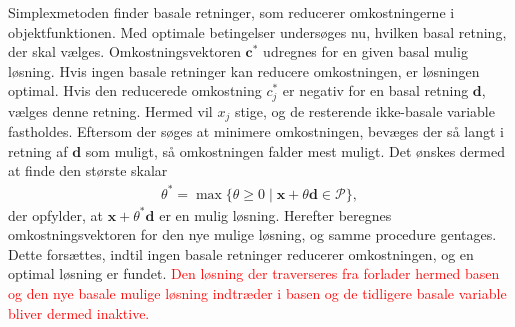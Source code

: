 \noindent
Simplexmetoden finder basale retninger, som reducerer omkostningerne i objektfunktionen. 
Med optimale betingelser undersøges nu, hvilken basal retning, der skal vælges. 
Omkostningsvektoren $\mathbf{c}^*$ udregnes for en given basal mulig løsning. 
Hvis ingen basale retninger kan reducere omkostningen, er løsningen optimal. 
Hvis den reducerede omkostning $c^*_j$ er negativ for en basal retning $\mathbf{d}$, vælges denne retning. 
Hermed vil $x_j$ stige, og de resterende ikke-basale variable fastholdes.
Eftersom der søges at minimere omkostningen, bevæges der så langt i retning af $\textbf{d}$ som muligt, så omkostningen falder mest muligt.
Det ønskes dermed at finde den største skalar
\begin{align*}
\theta^* = \max \{ \theta \geq 0 \mid \textbf{x} + \theta\textbf{d} \in \mathcal{P} \},
\end{align*}
%
der opfylder, at $\mathbf{x} + \theta^* \mathbf{d}$ er en mulig løsning.
Herefter beregnes omkostningsvektoren for den nye mulige løsning, og samme procedure gentages.
Dette forsættes, indtil ingen basale retninger reducerer omkostningen, og en optimal løsning er fundet.
\textcolor{red}{
Den løsning der traverseres fra forlader hermed basen og den nye basale mulige løsning indtræder i basen og de tidligere basale variable bliver dermed inaktive.}
%
%
%
%	
%	
%	
%	
%